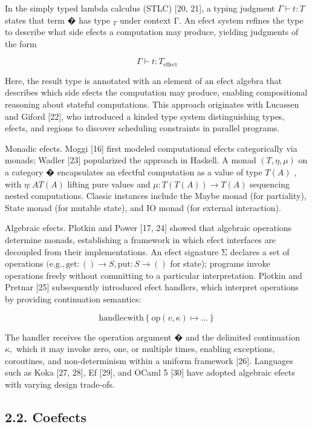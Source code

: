 \documentclass[
  10
]{article}
\begin{document}
In the simply typed lambda calculus (STLC) {[}20, 21{]}, a typing
judgment \(\Gamma \vdash t : T\) states that term � has type \(_ T\)
under context Γ. An efect system refines the type to describe what side
efects a computation may produce, yielding judgments of the form

\[
\Gamma \vdash t : T _ { \mathrm { e f f e c t } }\tag{1}
\]

Here, the result type is annotated with an element of an efect algebra
that describes which side efects the computation may produce, enabling
compositional reasoning about stateful computations. This approach
originates with Lucassen and Giford {[}22{]}, who introduced a kinded
type system distinguishing types, efects, and regions to discover
scheduling constraints in parallel programs.

Monadic efects. Moggi {[}16{]} first modeled computational efects
categorically via monads; Wadler {[}23{]} popularized the approach in
Haskell. A monad \(( T , \eta , \mu )\) on a category �︀ encapsulates an
efectful computation as a value of type \(T ( A )\) , with
\(\eta : A  T ( A )\) lifting pure values and
\(\mu : T ( T ( A ) ) \to T ( A )\) sequencing nested computations.
Classic instances include the Maybe monad (for partiality), State monad
(for mutable state), and IO monad (for external interaction).

Algebraic efects. Plotkin and Power {[}17, 24{]} showed that algebraic
operations determine monads, establishing a framework in which efect
interfaces are decoupled from their implementations. An efect signature
Σ declares a set of operations
\(( \mathrm { e . g . , g e t : } ( ) \to S , \mathrm { p u t : } S \to ( )\)
for state); programs invoke operations freely without committing to a
particular interpretation. Plotkin and Pretnar {[}25{]} subsequently
introduced efect handlers, which interpret operations by providing
continuation semantics:

\[
\mathrm { h a n d l e } e \mathrm { w i t h } \left\{ \mathrm { o p } ( v , \kappa ) \mapsto \dots \right\}\tag{2}
\]

The handler receives the operation argument � and the delimited
continuation \(\kappa ,\) which it may invoke zero, one, or multiple
times, enabling exceptions, coroutines, and non-determinism within a
uniform framework {[}26{]}. Languages such as Koka {[}27, 28{]}, Ef
{[}29{]}, and OCaml 5 {[}30{]} have adopted algebraic efects with
varying design trade-ofs.

\subsection{2.2. Coefects}\label{coefects}
\end{document}
